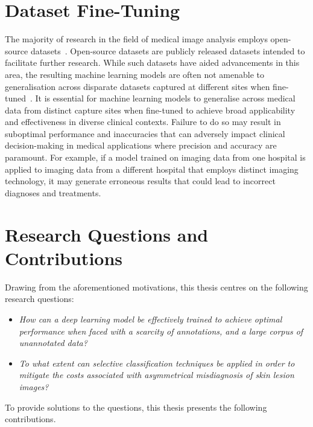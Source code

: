 \section{Dataset Fine-Tuning}
The majority of research in the field of medical image analysis employs open-source datasets~\citep{wu2022skin}. Open-source datasets are publicly released datasets intended to facilitate further research. While such datasets have aided advancements in this area, the resulting machine learning models are often not amenable to generalisation across disparate datasets captured at different sites when fine-tuned~\citep{chin2022prepare}. It is essential for machine learning models to generalise across medical data from distinct capture sites when fine-tuned to achieve broad applicability and effectiveness in diverse clinical contexts. Failure to do so may result in suboptimal performance and inaccuracies that can adversely impact clinical decision-making in medical applications where precision and accuracy are paramount. For example, if a model trained on imaging data from one hospital is applied to imaging data from a different hospital that employs distinct imaging technology, it may generate erroneous results that could lead to incorrect diagnoses and treatments.



\section{Research Questions and Contributions}
\label{sec:research_contributions}
Drawing from the aforementioned motivations, this thesis centres on the following research questions:

\begin{itemize}
	\item \textit{How can a deep learning model be effectively trained to achieve optimal performance when faced with a scarcity of annotations, and a large corpus of unannotated data?}
	\item \textit{To what extent can selective classification techniques be applied in order to mitigate the costs associated with asymmetrical misdiagnosis of skin lesion images?}
\end{itemize}

\noindent To provide solutions to the questions, this thesis presents the following contributions.

